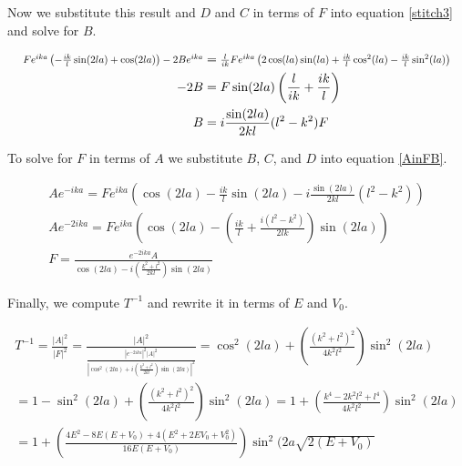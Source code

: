 \documentclass[letterpaper,12pt]{article}
\begin{document}
    Now we substitute this result and $D$ and $C$ in terms of $F$ into equation
    \eqref{stitch3} and solve for $B$.

    \begin{align*}
        \scalebox{0.8}{$
        Fe^{ika}
        \left(
        -\frac{ik}{l}\sin(2la) + \cos(2la)
        \right)
        - 2Be^{ika}
        $}
        &=
        \scalebox{0.8}{$
        \frac{l}{ik}Fe^{ika}
        \left(
        2\cos(la)\sin(la) + \frac{ik}{l}\cos^2(la) - \frac{ik}{l}\sin^2(la)
        \right)
        $}
        \\
        -2B &= F\sin(2la)
        \left(
        \frac{l}{ik} + \frac{ik}{l}
        \right)
        \\
        B &= i\frac{\sin(2la)}{2kl}(l^2 - k^2)F
    \end{align*}

    To solve for $F$ in terms of $A$ we substitute $B$, $C$, and $D$ into
    equation \eqref{AinFB}.

    \begin{gather*}
        Ae^{-ika}
        = Fe^{ika}
        \left(
        \cos(2la) - \frac{ik}{l}\sin(2la)
        - i\frac{\sin(2la)}{2kl}(l^2 - k^2)
        \right)
        \\
        Ae^{-2ika}
        = Fe^{ika}
        \left(
        \cos(2la) -
        \left(
        \frac{ik}{l} + \frac{i(l^2 - k^2)}{2lk}
        \right)
        \sin(2la)
        \right)
        \\
        F = \frac{e^{-2ika}A}{\cos(2la) - i
        \left(
        \frac{k^2 + l^2}{2kl}
        \right)
        \sin(2la)}
    \end{gather*}

    Finally, we compute $T^{-1}$ and rewrite it in terms of $E$ and $V_0$.

    \begin{gather*}
        T^{-1} = \frac{\left| A \right| ^{2}}{\left| F \right| ^{2}}
        = \frac{\left| A \right| ^{2}}{
            \frac{\left| e^{-2ika} \right| ^2 \left| A \right | ^2}{
                    \left|
                    \cos^2(2la) + i \left( \frac{k^2 + l^2}{2kl} \right)
                    \sin(2la)
                    \right| ^2
                }
            }
        = \cos^2(2la) + \left( \frac{(k^2 + l^2)^2}{4k^2l^2} \right) \sin^2(2la)
        \\
        = 1 - \sin^2(2la) + \left( \frac{(k^2 + l^2)^2}{4k^2l^2}
        \right) \sin^2(2la)
        = 1 + \left( \frac{k^4 - 2k^2l^2 + l^4}{4k^2l^2} \right) \sin^2(2la)
        \\
        = 1 + \left( \frac{4E^2 - 8E(E + V_0) + 4(E^2 + 2EV_0 + V_0^2)}
        {16E(E + V_0)} \right) \sin^2(2a\sqrt{2(E + V_0)}
    \end{gather*}
\end{document}
